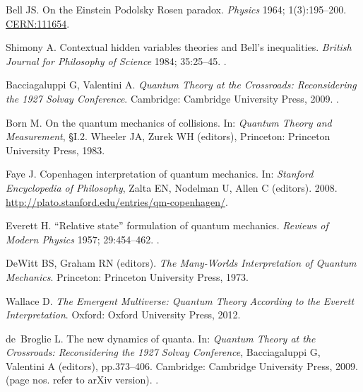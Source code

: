 \documentclass[DIV=calc,fontsize=12pt]{scrartcl} %
\theoremstyle{definition}
\theoremstyle{plain}
\begin{document}
\raggedright

\begin{thebibliography}{999}

Bell JS.
\newblock On the Einstein Podolsky Rosen paradox.
\newblock \emph{Physics} 1964; 1(3):195--200.
\newblock \href{https://cds.cern.ch/record/111654}{CERN:111654}.

Shimony A.
\newblock Contextual hidden variables theories and {B}ell's inequalities.
\newblock \emph{British Journal for Philosophy of Science} 1984; 35:25--45.
\newblock \href {http://dx.doi.org/10.1093/bjps/35.1.25}
{}.

Bacciagaluppi G, Valentini A.
\newblock \emph{Quantum Theory at the Crossroads: Reconsidering the 1927 Solvay Conference}.
\newblock Cambridge: Cambridge University Press, 2009.
\newblock \href {http://arxiv.org/abs/quant-ph/0609184}
{}.

Born M.
\newblock On the quantum mechanics of collisions.
\newblock In: \emph{Quantum Theory and Measurement}, \S I.2. Wheeler JA, Zurek WH (editors), Princeton: Princeton University Press, 1983.

Faye J.
\newblock Copenhagen interpretation of quantum mechanics.
\newblock In: \emph{Stanford Encyclopedia of Philosophy}, Zalta EN, Nodelman U, Allen C (editors). 2008.
\newblock \url{http://plato.stanford.edu/entries/qm-copenhagen/}.

Everett H.
\newblock ``Relative state'' formulation of quantum mechanics.
\newblock \emph{Reviews of Modern Physics} 1957; 29:454--462.
\newblock \href {http://dx.doi.org/10.1103/RevModPhys.29.454}
{}.

DeWitt BS, Graham RN (editors).
\newblock \emph{The Many-Worlds Interpretation of Quantum Mechanics}.
\newblock Princeton: Princeton University Press, 1973.

Wallace D.
\newblock \emph{The Emergent Multiverse: Quantum Theory According to the Everett Interpretation}.
\newblock Oxford: Oxford University Press, 2012.

de~Broglie L.
\newblock The new dynamics of quanta.
\newblock In: \emph{Quantum Theory at the Crossroads: Reconsidering the 1927 Solvay Conference}, Bacciagaluppi G, Valentini A (editors), pp.373--406. Cambridge: Cambridge University Press, 2009.
\newblock (page nos. refer to arXiv version).
\newblock \href {http://arxiv.org/abs/quant-ph/0609184}
{}.


\end{thebibliography}
\end{document}
